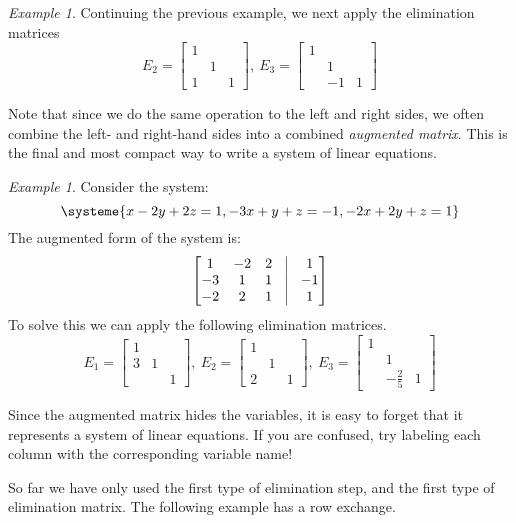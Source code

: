 \documentclass[11pt,oneside]{amsbook}
\theoremstyle{definition}
\theoremstyle{plain}
\theoremstyle{definition}
\theoremstyle{remark}
\newtheorem{example}[theorem]{Example}
\numberwithin{equation}{section}
\numberwithin{figure}{section}
\begin{document}
\begin{example}
  Continuing the previous example, we next apply the elimination matrices
  \[E_2=\begin{bmatrix}1\\&1\\1&&1\end{bmatrix},\ 
    E_3=\begin{bmatrix}1\\&1\\&-1&1\end{bmatrix}
  \]
\end{example}

Note that since we do the same operation to the left and right sides, we often combine the left- and right-hand sides into a combined \emph{augmented matrix}. This is the final and most compact way to write a system of linear equations. 

\begin{example}
  Consider the system:
  \[\systeme{x-2y+2z=1,-3x+y+z=-1,-2x+2y+z=1}
  \]
  The augmented form of the system is:
  \[\begin{bmatrix}
      1&-2&2&\vline&1\\
      -3&1&1&\vline&-1\\
      -2&2&1&\vline&1
    \end{bmatrix}
  \]
  To solve this we can apply the following elimination matrices.
  \[E_1=\begin{bmatrix}1\\3&1\\&&1\end{bmatrix},\ 
    E_2=\begin{bmatrix}1\\&1\\2&&1\end{bmatrix},\ 
    E_3=\begin{bmatrix}1\\&1\\&-\frac25&1\end{bmatrix}
  \]
\end{example}

Since the augmented matrix hides the variables, it is easy to forget that it represents a system of linear equations. If you are confused, try labeling each column with the corresponding variable name!

So far we have only used the first type of elimination step, and the first type of elimination matrix. The following example has a row exchange.
\end{document}
